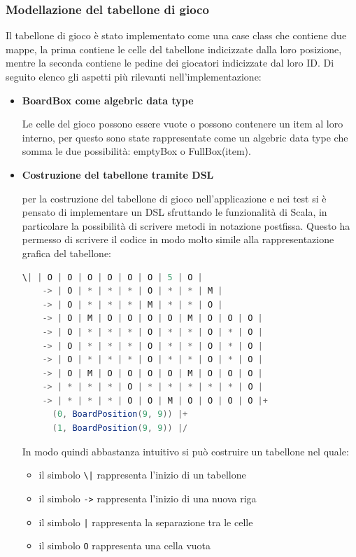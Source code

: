 \subsubsection{Modellazione del tabellone di gioco}
Il tabellone di gioco è stato implementato come una case class che contiene due mappe, 
la prima contiene le celle del tabellone indicizzate dalla loro posizione, mentre la seconda contiene
le pedine dei giocatori indicizzate dal loro ID. Di seguito elenco gli aspetti più rilevanti nell'implementazione:
\begin{itemize}
    \item \textbf{BoardBox come algebric data type}\par
    Le celle del gioco possono essere vuote o possono contenere un item al loro interno, per questo sono
    state rappresentate come un algebric data type che somma le due possibilità: emptyBox o FullBox(item).
    \item \textbf{Costruzione del tabellone tramite DSL}\par
    per la costruzione del tabellone di gioco nell'applicazione e nei test si è pensato di implementare un DSL
    sfruttando le funzionalità di Scala, in particolare la possibilità di scrivere metodi in notazione postfissa.
    Questo ha permesso di scrivere il codice in modo molto simile alla rappresentazione grafica del tabellone:
    \newpage
    \begin{lstlisting}[language=Scala]
    \| | O | O | O | O | O | O | 5 | O |
    -> | O | * | * | * | O | * | * | M |
    -> | O | * | * | * | M | * | * | O |
    -> | O | M | O | O | O | O | M | O | O | O |
    -> | O | * | * | * | O | * | * | O | * | O |
    -> | O | * | * | * | O | * | * | O | * | O |
    -> | O | * | * | * | O | * | * | O | * | O |
    -> | O | M | O | O | O | O | M | O | O | O |
    -> | * | * | * | O | * | * | * | * | * | O |
    -> | * | * | * | O | O | M | O | O | O | O |+
      (0, BoardPosition(9, 9)) |+
      (1, BoardPosition(9, 9)) |/
    \end{lstlisting}
    In modo quindi abbastanza intuitivo si può costruire un tabellone nel quale:
    \begin{itemize}
        \item il simbolo \texttt{\textbackslash|} rappresenta l'inizio di un tabellone
        \item il simbolo \texttt{->} rappresenta l'inizio di una nuova riga
        \item il simbolo \texttt{|} rappresenta la separazione tra le celle
        \item il simbolo \texttt{O} rappresenta una cella vuota

\end{itemize}
\end{itemize}
